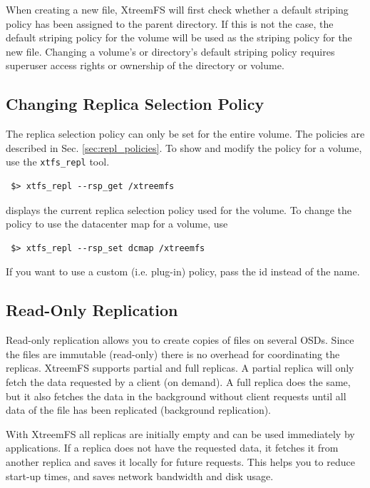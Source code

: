 \documentclass[a4paper,10pt]{book}
\begin{document}
When creating a new file, XtreemFS will first check whether a default striping policy has been assigned to the parent directory. If this is not the case, the default striping policy for the volume will be used as the striping policy for the new file. Changing a volume's or directory's default striping policy requires superuser access rights or ownership of the directory or volume.

\subsection{Changing Replica Selection Policy}\label{sec:repl_select_policy}

The replica selection policy can only be set for the entire volume. The policies are described in Sec. \ref{sec:repl_policies}. To show and modify the policy for a volume, use the \texttt{xtfs\_repl} tool.

\begin{verbatim}
 $> xtfs_repl --rsp_get /xtreemfs
\end{verbatim}

displays the current replica selection policy used for the volume. To change the policy to use the datacenter map for  a volume, use

\begin{verbatim}
 $> xtfs_repl --rsp_set dcmap /xtreemfs
\end{verbatim}

If you want to use a custom (i.e. plug-in) policy, pass the id instead of the name.

\subsection{Read-Only Replication}
Read-only replication allows you to create copies of files on several OSDs. Since the files are immutable (read-only) there is no overhead for coordinating the replicas. XtreemFS supports partial and full replicas.
A partial replica will only fetch the data requested by a client (on demand). A full replica does the same, but it also fetches the data in the background without client requests until all data of the file has been replicated (background replication).

With XtreemFS all replicas are initially empty and can be used immediately by applications. If a replica does not have the requested data, it fetches it from another replica and saves it locally for future requests. This helps you to reduce start-up times, and saves network bandwidth and disk usage.
\end{document}
